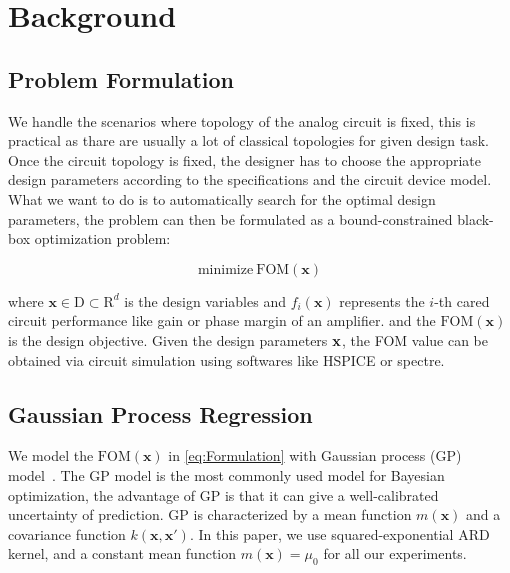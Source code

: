 \section{Background}


\subsection{Problem Formulation}


We handle the scenarios where topology of the analog circuit is fixed, this is
practical as thare are usually a lot of classical topologies for given design
task. Once the circuit topology is fixed, the designer has to choose the
appropriate design parameters according to the specifications and the circuit
device model. What we want to do is to automatically search for the optimal
design parameters, the problem can then be formulated as a bound-constrained
black-box optimization problem:

\begin{equation}
    \label{eq:Formulation}
    \text{minimize}~\mathrm{FOM}(\bm{x})
\end{equation}

where $\bm{x} \in \textrm{D} \subset \textrm{R}^d$ is the design variables
and $f_i(\bm{x})$ represents the $i$-th cared circuit performance like gain
or phase margin of an amplifier. and the $\mathrm{FOM}(\bm{x})$ is the
design objective. Given the design parameters $\bf{x}$, the FOM value can be
obtained via circuit simulation using softwares like HSPICE or spectre.


\subsection{Gaussian Process Regression}

We model the $\mathrm{FOM}(\bm{x})$ in \eqref{eq:Formulation} with Gaussian
process (GP) model~\cite{GPML}. The GP model is the most commonly used model
for Bayesian optimization, the advantage of GP is that it can give a
well-calibrated uncertainty of prediction. GP is characterized by a mean
function $m(\bm{x})$ and a covariance function $k(\bm{x}, \bm{x'})$. In this
paper, we use squared-exponential ARD kernel, and a constant mean function
$m(\bm{x}) = \mu_0$ for all our experiments.

